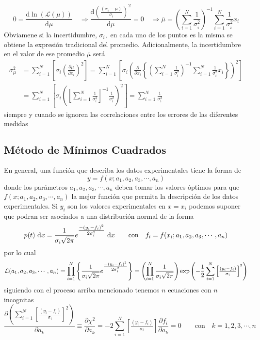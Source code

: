 \documentclass[spanish,titlepage,11pt]{article}
\begin{document}
\[
0=\frac{\mathrm{d\ln}\left(  \mathcal{L}(\mu)\right)  }{\mathrm{d}\mu}%
\quad\Rightarrow\frac{\mathrm{d}\left(  \tfrac{\left(  x_{i}-\mu\right)
}{\sigma_{i}}\right)  ^{2}}{\mathrm{d}\mu}=0\quad\Rightarrow\bar{\mu}=\left(
\sum_{i=1}^{N}\frac{1}{\sigma_{i}^{2}}\right)  ^{-1}\sum_{i=1}^{N}\frac
{1}{\sigma_{i}^{2}}x_{i}
\]
Obviamene si la incertidumbre, $\sigma_{i},$ en cada uno de los puntos es la
misma se obtiene la expresi\'{o}n tradicional del promedio. Adicionalmente, la
incertidumbre en el valor de ese promedio $\bar{\mu}$ ser\'{a}
\begin{align*}
\sigma_{\mu}^{2}  &  =\sum_{i=1}^{N}\left[  \sigma_{i}\left(  \frac
{\partial\mu}{\partial x_{i}}\right)  ^{2}\right]  =\sum_{i=1}^{N}\left[
\sigma_{i}\left(  \frac{\partial}{\partial x_{i}}\left\{  \left(  \sum
_{i=1}^{N}\frac{1}{\sigma_{i}^{2}}\right)  ^{-1}\sum_{i=1}^{N}\frac{1}%
{\sigma_{i}^{2}}x_{i}\right\}  \right)  ^{2}\right] \\
&  =\sum_{i=1}^{N}\left[  \sigma_{i}\left(  \left[  \sum_{i=1}^{N}\frac
{1}{\sigma_{i}^{2}}\right]  ^{-1}\frac{1}{\sigma_{i}^{2}}\right)  ^{2}\right]
=\sum_{i=1}^{N}\frac{1}{\sigma_{i}^{2}}%
\end{align*}
siempre y cuando se ignoren las correlaciones entre los errores de las
diferentes medidas

\subsection{M\'{e}todo de M\'{i}nimos Cuadrados}

En general, una funci\'{o}n que describa los datos experimentales tiene la
forma de
\[
y=f(x;a_{1},a_{2},a_{3},\cdots,a_{n})
\]
donde los par\'{a}metros $a_{1},a_{2},a_{3},\cdots,a_{n}$ deben tomar los
valores \'{o}ptimos para que $f(x;a_{1},a_{2},a_{3},\cdots,a_{n})$ la mejor
funci\'{o}n que permita la descripci\'{o}n de los datos experimentales. Si
$y_{i}$ son los valores experimentales en $x=x_{i}$ podemos suponer que podran
ser asociados a una distribuci\'{o}n normal de la forma
\[
p(t)\ \mathrm{d}x=\frac{1}{\sigma_{i}\sqrt{2\pi}}{\Large e}^{\tfrac{-\left(
y_{i}-f_{i}\right)  ^{2}}{2\sigma_{i}^{2}}}\ \mathrm{d}x\qquad\mathrm{con\quad
}f_{i}=f(x_{i};a_{1},a_{2},a_{3},\cdots,a_{n})
\]
por lo cual
\[
\mathcal{L}(a_{1},a_{2},a_{3},\cdots,a_{n})=\prod_{i=1}^{N}\left\{  \frac
{1}{\sigma_{i}\sqrt{2\pi}}{\Large e}^{\tfrac{-\left(  y_{i}-f_{i}\right)
^{2}}{2\sigma_{i}^{2}}}\right\}  =\left(  \prod_{i=1}^{N}\frac{1}{\sigma
_{i}\sqrt{2\pi}}\right)  \exp\left(  -\frac{1}{2}\sum_{i=1}^{N}\left[
\tfrac{\left(  y_{i}-f_{i}\right)  }{\sigma_{i}}\right]  ^{2}\right)
\]
siguiendo con el proceso arriba mencionado tenemos $n$ ecuaciones con $n$
incognitas
\[
\frac{\partial\left(  \sum_{i=1}^{N}\left[  \tfrac{\left(  y_{i}-f_{i}\right)
}{\sigma_{i}}\right]  ^{2}\right)  }{\partial a_{k}}\equiv\frac{\partial
\chi^{2}}{\partial a_{k}}=-2\sum_{i=1}^{N}\left[  \tfrac{\left(  y_{i}%
-f_{i}\right)  }{\sigma_{i}}\right]  \frac{\partial f_{i}}{\partial a_{k}%
}=0\qquad\mathrm{con\quad}k=1,2,3,\cdots,n
\]
\end{document}
